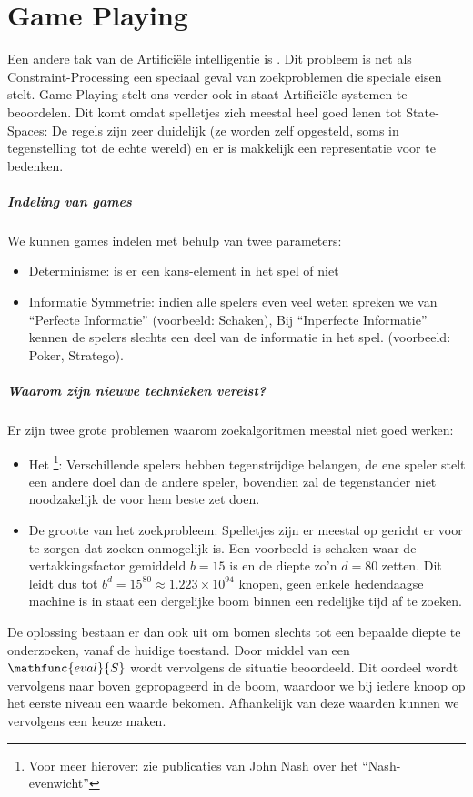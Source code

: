 \chapter{Game Playing}
\label{s:gamePlaying}
Een andere tak van de Artifici\"ele intelligentie is . Dit probleem is net als Constraint-Processing een speciaal geval van zoekproblemen die speciale eisen stelt. Game Playing stelt ons verder ook in staat Artifici\"ele systemen te beoordelen. Dit komt omdat spelletjes zich meestal heel goed lenen tot State-Spaces: De regels zijn zeer duidelijk (ze worden zelf opgesteld, soms in tegenstelling tot de echte wereld) en er is makkelijk een representatie voor te bedenken.
\paragraph{Indeling van games}
We kunnen games indelen met behulp van twee parameters:
\begin{itemize}
 \item Determinisme: is er een kans-element in het spel of niet
 \item Informatie Symmetrie: indien alle spelers even veel weten spreken we van ``Perfecte Informatie'' (voorbeeld: Schaken), Bij ``Inperfecte Informatie'' kennen de spelers slechts een deel van de informatie in het spel. (voorbeeld: Poker, Stratego).
\end{itemize}
\paragraph{Waarom zijn nieuwe technieken vereist?}
Er zijn twee grote problemen waarom zoekalgoritmen meestal niet goed werken:
\begin{itemize}
 \item Het \footnote{Voor meer hierover: zie publicaties van John Nash over het ``Nash-evenwicht''}: Verschillende spelers hebben tegenstrijdige belangen, de ene speler stelt een andere doel dan de andere speler, bovendien zal de tegenstander niet noodzakelijk de voor hem beste zet doen.
 \item De grootte van het zoekprobleem: Spelletjes zijn er meestal op gericht er voor te zorgen dat zoeken onmogelijk is. Een voorbeeld is schaken waar de vertakkingsfactor gemiddeld $b=15$ is en de diepte zo'n $d=80$ zetten. Dit leidt dus tot $b^d=15^{80}\approx1.223\times10^{94}$ knopen, geen enkele hedendaagse machine is in staat een dergelijke boom binnen een redelijke tijd af te zoeken.
\end{itemize}
De oplossing bestaan er dan ook uit om bomen slechts tot een bepaalde diepte te onderzoeken, vanaf de huidige toestand. Door middel van een  $\mathfunc{eval}{S}$ wordt vervolgens de situatie beoordeeld. Dit oordeel wordt vervolgens naar boven gepropageerd in de boom, waardoor we bij iedere knoop op het eerste niveau een waarde bekomen. Afhankelijk van deze waarden kunnen we vervolgens een keuze maken.
